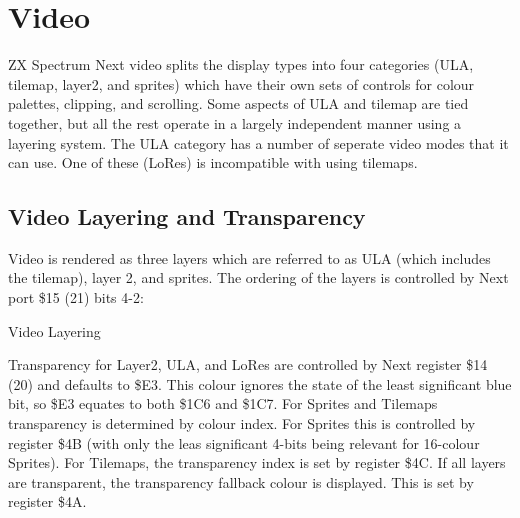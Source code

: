 \section{Video}

ZX Spectrum Next video splits the display types into four categories
(ULA, tilemap, layer2, and sprites) which have their own sets of
controls for colour palettes, clipping, and scrolling. Some aspects of
ULA and tilemap are tied together, but all the rest operate in a
largely independent manner using a layering system. The ULA category
has a number of seperate video modes that it can use. One of these
(LoRes) is incompatible with using tilemaps.

\subsection{Video Layering and Transparency}
Video is rendered as three layers which are referred to as ULA (which
includes the tilemap), layer 2, and sprites.  The ordering of the
layers is controlled by Next port \$15 (21) bits 4-2:

\begin{table}[h!]
  \begin{center}
    \caption{Video Layering}
    \label{table1}
  \end{center}
\end{table}
                  
Transparency for Layer2, ULA, and LoRes are controlled by Next
register \$14 (20) and defaults to \$E3. This colour ignores the state
of the least significant blue bit, so \$E3 equates to both \$1C6 and
\$1C7. For Sprites and Tilemaps transparency is determined by colour
index. For Sprites this is controlled by register \$4B (with only the
leas significant 4-bits being relevant for 16-colour Sprites). For
Tilemaps, the transparency index is set by register \$4C. If all
layers are transparent, the transparency fallback colour is
displayed. This is set by register \$4A.

